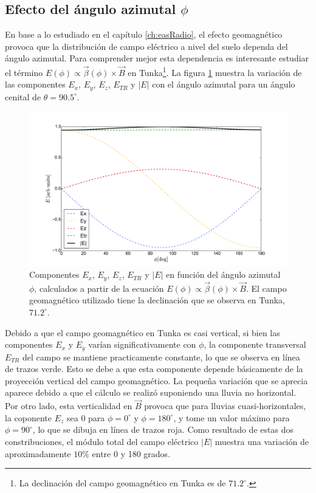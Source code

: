 	\subsection{Efecto del \'angulo azimutal $\phi$}
	\label{sbsc:depPhiRadio}
	En base a lo estudiado en el cap\'itulo \ref{ch:easRadio}, el efecto geomagn\'etico provoca que la distribuci\'on de campo el\'ectrico a nivel del suelo dependa del \'angulo azimutal.
	Para comprender mejor esta dependencia es interesante estudiar el t\'ermino $E(\phi)\propto\vec\beta(\phi)\times \vec B$ en Tunka\footnote{La declinaci\'on del campo geomagn\'etico en Tunka es de $71.2^\circ$.}.
	La figura \ref{fig:geomComps_Tunka} muestra la variaci\'on de las componentes $E_x$, $E_y$, $E_z$, $E_{TR}$ y $|E|$ con el \'angulo azimutal para un \'angulo cenital de $\theta=90.5^\circ$.
	\begin{figure}[ht!]
		\centering
		\includegraphics[width=\textwidth]{./fig/simulacionRadio/geomComps_Tunka}
		\caption{\label{fig:geomComps_Tunka}
		Componentes $E_x$, $E_y$, $E_z$, $E_{TR}$ y $|E|$ en funci\'on del \'angulo azimutal 
		$\phi$, calculados a partir de la ecuaci\'on $E(\phi)\propto\vec\beta(\phi)\times \vec B$. El campo geomagn\'etico utilizado tiene la declinaci\'on que se observa en Tunka,$71.2^\circ$. 
		}
	\end{figure}
	Debido a que el campo geomagn\'etico en Tunka es casi vertical, si bien las componentes $E_x$ y $E_y$ var\'ian significativamente con $\phi$, la componente transversal $E_{TR}$ del campo se mantiene practicamente constante, lo que se observa en l\'inea de trazos verde. 
	Esto se debe a que esta componente depende b\'asicamente de la proyecci\'on vertical del campo geomagn\'etico.
	La peque\~na variaci\'on que se aprecia aparece debido a que el c\'alculo se realiz\'o suponiendo una lluvia no horizontal.
	Por otro lado, esta verticalidad en $\vec B$ provoca que para lluvias cuasi-horizontales, la coponente $E_z$ sea 0 para $\phi=0^\circ$ y $\phi=180^\circ$, y tome un valor m\'aximo para $\phi=90^\circ$, lo que se dibuja en l\'inea de trazos roja. 
	Como resultado de estas dos constribuciones, el m\'odulo total del campo el\'ectrico $|E|$ muestra una variaci\'on de aproximadamente $10\%$ entre 0 y 180 grados. 
	
